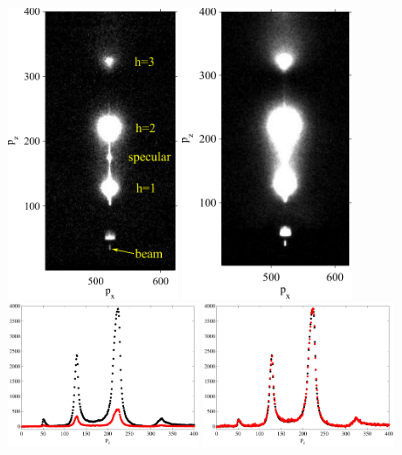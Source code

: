 \begin{figure}[jtbp]
  \centering
  \includegraphics[width=0.4\textwidth]{figures/ripple/MMs/laxs/olddopc045_labels}
  \includegraphics[width=0.4\textwidth]{figures/ripple/MMs/laxs/olddopc044}
  \includegraphics[width=0.45\textwidth]{figures/ripple/MMs/laxs/attenuator1}
  \includegraphics[width=0.45\textwidth]{figures/ripple/MMs/laxs/attenuator2}

\end{figure}

